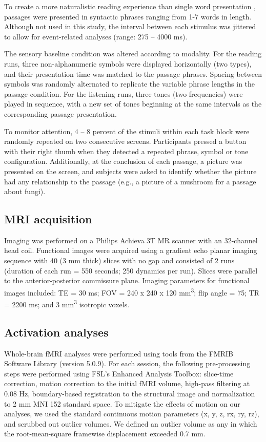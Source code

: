 To create a more naturalistic reading experience than single word presentation \cite{Rayner1986}, passages were presented in syntactic phrases ranging from 1-7 words in length. Although not used in this study, the interval between each stimulus was jittered to allow for event-related analyses (range: 275 – 4000 ms). 

The sensory baseline condition was altered according to modality. For the reading runs, three non-alphanumeric symbols were displayed horizontally (two types), and their presentation time was matched to the passage phrases. Spacing between symbols was randomly alternated to replicate the variable phrase lengths in the passage condition. For the listening runs, three tones (two frequencies) were played in sequence, with a new set of tones beginning at the same intervals as the corresponding passage presentation. 

To monitor attention, 4 – 8 percent of the stimuli within each task block were randomly repeated on two consecutive screens.  Participants pressed a button with their right thumb when they detected a repeated phrase, symbol or tone configuration. Additionally, at the conclusion of each passage, a picture was presented on the screen, and subjects were asked to identify whether the picture had any relationship to the passage (e.g., a picture of a mushroom for a passage about fungi). 

\subsection{MRI acquisition}

Imaging was performed on a Philips Achieva 3T MR scanner with an 32-channel head coil. Functional images were acquired using a gradient echo planar imaging sequence with 40 (3 mm thick) slices with no gap and consisted of 2 runs (duration of each run = 550 seconds; 250 dynamics per run). Slices were parallel to the anterior-posterior commissure plane. Imaging parameters for functional images included: TE = 30 ms; FOV = 240 x 240 x 120 mm\textsuperscript{3}; flip angle = 75\degree; TR = 2200 ms; and 3 mm\textsuperscript{3} isotropic voxels.

\subsection{Activation analyses}

Whole-brain fMRI analyses were performed using tools from the FMRIB Software Library (version 5.0.9). For each session, the following pre-processing steps were performed using FSL’s Enhanced Analysis Toolbox:  slice-time correction, motion correction to the initial fMRI volume, high-pass filtering at 0.08 Hz, boundary-based registration to the structural image and normalization to 2 mm MNI 152 standard space. To mitigate the effects of motion on our analyses, we used the standard continuous motion parameters (x, y, z, rx, ry, rz), and scrubbed out outlier volumes. We defined an outlier volume as any in which the root-mean-square framewise displacement exceeded 0.7 mm. 

